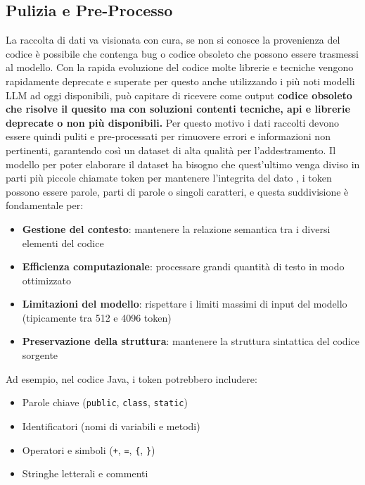 \documentclass[12pt,a4paper,openright,twoside]{book}
\begin{document}
\subsection{Pulizia e Pre-Processo}
La raccolta di dati va visionata con cura, se non si conosce la provenienza del codice è possibile che contenga bug o codice obsoleto che possono essere trasmessi al modello.
Con la rapida evoluzione del codice molte librerie e tecniche vengono rapidamente deprecate e superate per questo anche utilizzando i più noti modelli LLM ad oggi disponibili, può capitare di ricevere come output \textbf{codice obsoleto che risolve il quesito ma con soluzioni contenti tecniche, api e librerie deprecate o non più disponibili.}
Per questo motivo i dati raccolti devono essere quindi puliti e pre-processati per rimuovere errori e informazioni non pertinenti, garantendo così un dataset di alta qualità per l'addestramento.
\newline Il modello per poter elaborare il dataset ha bisogno che quest'ultimo venga diviso in parti più piccole chiamate token per mantenere l'integrita del dato \cite{stanford-codegen},
i token possono essere parole, parti di parole o singoli caratteri, e questa suddivisione è fondamentale per:

\begin{itemize}
    \item \textbf{Gestione del contesto}: mantenere la relazione semantica tra i diversi elementi del codice
    \item \textbf{Efficienza computazionale}: processare grandi quantità di testo in modo ottimizzato
    \item \textbf{Limitazioni del modello}: rispettare i limiti massimi di input del modello (tipicamente tra 512 e 4096 token)
    \item \textbf{Preservazione della struttura}: mantenere la struttura sintattica del codice sorgente
\end{itemize}

Ad esempio, nel codice Java, i token potrebbero includere:
\begin{itemize}
    \item Parole chiave (\texttt{public}, \texttt{class}, \texttt{static})
    \item Identificatori (nomi di variabili e metodi)
    \item Operatori e simboli (\texttt{+}, \texttt{=}, \texttt{\{}, \texttt{\}})
    \item Stringhe letterali e commenti
\end{itemize}
\end{document}
